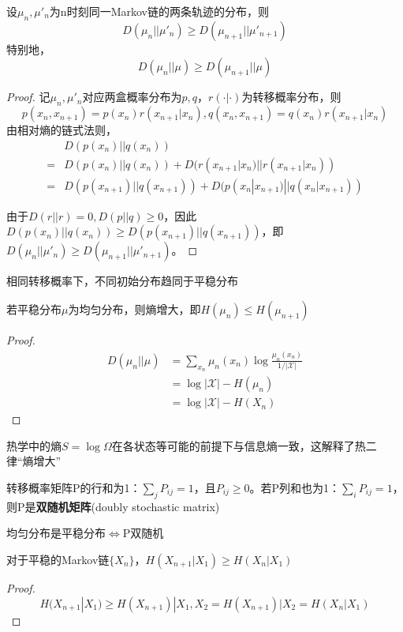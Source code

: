 \documentclass{ctexbook}
\begin{document}
\begin{theorem}
    设$\mu_n,\mu'_n$为n时刻同一Markov链的两条轨迹的分布，则
    \[D(\mu_n||\mu'_n) \geq D(\mu_{n+1}||\mu'_{n+1})\]
    特别地，
    \[D(\mu_n||\mu)\geq D(\mu_{n+1}||\mu)\]
\end{theorem}
\begin{proof}
    记$\mu_n,\mu'_n$对应两盒概率分布为$p,q$，$r(\cdot|\cdot)$为转移概率分布，则
    \[p(x_n,x_{n+1}) = p(x_n)r(x_{n+1}|x_n),q(x_n,x_{n+1}) = q(x_n)r(x_{n+1}|x_n)\]
    由相对熵的链式法则，\begin{align*}
        &D(p(x_n)||q(x_n))\\
        =& D(p(x_n)||q(x_n)) + D(r(x_{n+1}|x_n)||r(x_{n+1}|x_n)) \\
        =& D(p(x_{n+1})||q(x_{n+1})) + D(p(x_n|x_{n+1})||q(x_n|x_{n+1})) 
    \end{align*}

    由于$D(r||r)=0,D(p||q)\geq 0$，因此$D(p(x_n)||q(x_n)) \geq D(p(x_{n+1})||q(x_{n+1}))$，即$D(\mu_n||\mu'_n) \geq D(\mu_{n+1}||\mu'_{n+1})$。
\end{proof}
\begin{remark}
    相同转移概率下，不同初始分布趋同于平稳分布
\end{remark}
\begin{corollary}
    若平稳分布$\mu$为均匀分布，则熵增大，即$H(\mu_n)\leq H(\mu_{n+1})$
\end{corollary}
\begin{proof}
    \begin{align*}
        D(\mu_n||\mu) &= \sum_{x_n} \mu_n(x_n) \log \frac{\mu_n(x_n)}{1/|\mathcal{X}|} \\
        &=\log|\mathcal{X} | - H(\mu_n) \\
        &=\log |\mathcal{X}|-H(X_n)
    \end{align*}
\end{proof}
\begin{remark}
    热学中的熵$S=\log \Omega$在各状态等可能的前提下与信息熵一致，这解释了热二律“熵增大”
\end{remark}

\begin{definition}
    转移概率矩阵P的行和为1：$\sum_{j} P_{ij} = 1$，且$P_{ij}\geq 0$。若P列和也为1：$\sum_{i} P_{ij} = 1$，则P是\textbf{双随机矩阵}(doubly stochastic matrix)

    均匀分布是平稳分布$\iff$P双随机
\end{definition}

\begin{theorem}
    对于平稳的Markov链$\{X_n\}$，$H(X_{n+1}|X_1)\geq H(X_n|X_1)$
\end{theorem}
\begin{proof}
    \[H(X_{n+1}|X_1) \geq H(X_{n+1})|X_1,X_2=H(X_{n+1})|X_2=H(X_n|X_1)\]
\end{proof}
\end{document}
